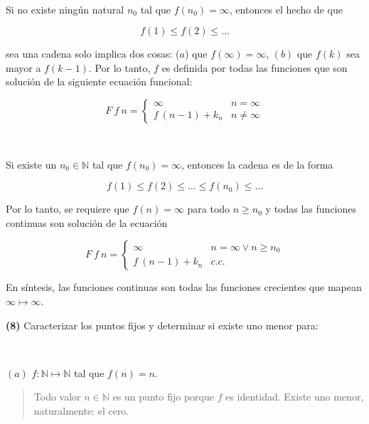 \documentclass[article, 12pt]{article}
\begin{document}
~ 

Si no existe ningún natural $n_0$ tal que $f(n_0) = \infty$, entonces el hecho
de que 

\begin{equation*}
  f(1) \leq f(2) \leq \ldots
\end{equation*}

sea una cadena solo implica dos cosas: ($a$) que $f(\infty) = \infty$, $(b)$ que 
$f(k)$ sea mayor a $f(k-1)$. Por lo tanto, $f$ es definida por todas las
funciones que son solución de la siguiente ecuación funcional:

\begin{equation*}
  F ~ f ~ n = \begin{cases}
    \infty & n = \infty\\ 
    f ~ (n-1) + k_n & n \neq \infty
  \end{cases}
\end{equation*}


~ 

Si existe un $n_0 \in \mathbb{N}$ tal que $f(n_0) = \infty$, entonces la cadena
es de la forma 

\begin{equation*}
  f(1) \leq f(2) \leq \ldots \leq f(n_0) \leq \ldots
\end{equation*}

Por lo tanto, se requiere que $f(n) = \infty$ para todo $n \geq n_0$ y todas las
funciones continuas son solución de la ecuación 

\begin{equation*}
  F ~ f ~ n = \begin{cases}
    \infty & n = \infty \lor  n \geq n_0\\ 
    f ~ (n-1) + k_n & c.c.
  \end{cases}
\end{equation*}

En síntesis, las funciones continuas son todas las funciones crecientes que
mapean $\infty \mapsto \infty$.


\pagebreak

\textbf{(8)} Caracterizar los puntos fijos y determinar si existe uno menor
para:

~

$(a)$ $f : \mathbb{N} \mapsto \mathbb{N}$ tal que $f(n) = n$.


\small
\begin{quote}

Todo valor $n \in \mathbb{N}$ es un punto fijo porque $f$ es identidad. Existe
uno menor, naturalmente: el cero.

\end{quote}
\normalsize
\end{document}
